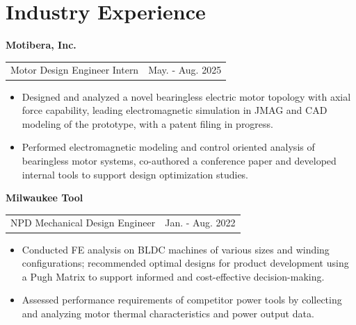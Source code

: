 \section{\sc Industry Experience}
{\bf{Motibera, Inc.}}\\
\begin{tabular}{@{}p{4.425in}p{1.1in}}
Motor Design Engineer Intern  & May. - Aug. 2025\\
\end{tabular}
\begin{itemize}
\setlength\itemsep{0em}
\item Designed and analyzed a novel bearingless electric motor topology with axial force capability, leading electromagnetic simulation in JMAG and CAD modeling of the prototype, with a patent filing in progress.
\item Performed electromagnetic modeling and control oriented analysis of bearingless motor systems, co-authored a conference paper and developed internal tools to support design optimization studies.
\end{itemize}


{\bf{Milwaukee Tool}}\\
\begin{tabular}{@{}p{4.45in}p{1.1in}}
NPD Mechanical Design Engineer  & Jan. - Aug. 2022\\
\end{tabular}

\begin{itemize}
\setlength\itemsep{0em}
\item Conducted FE analysis on BLDC machines of various sizes and winding configurations; recommended optimal designs for product development using a Pugh Matrix to support informed and cost-effective decision-making.
\item Assessed performance requirements of competitor power tools by collecting and analyzing motor thermal characteristics and power output data.
\end{itemize}
\endinput